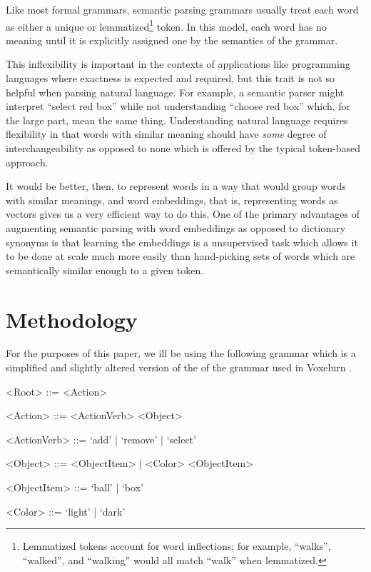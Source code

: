 \documentclass[a4paper]{article}
\begin{document}
Like most formal grammars, semantic parsing grammars usually treat each word
as either a unique or lemmatized\footnote{Lemmatized tokens account for word
inflections; for example, ``walks'', ``walked'', and ``walking'' would all
match ``walk'' when lemmatized.} token.
In this model, each word has no meaning until it is explicitly assigned one
by the semantics of the grammar.

This inflexibility is important in the contexts of applications like programming
languages where exactness is expected and required, but this trait is not so
helpful when parsing natural language.
For example, a semantic parser might interpret ``select red box'' while not
understanding ``choose red box'' which, for the large part, mean the same thing.
Understanding natural language requires flexibility in that words with
similar meaning should have \textit{some} degree of interchangeability as
opposed to none which is offered by the typical token-based approach.

It would be better, then, to represent words in a way that would group words
with similar meanings, and word embeddings, that is, representing words as
vectors gives us a very efficient way to do this.
One of the primary advantages of augmenting semantic parsing with word
embeddings as opposed to dictionary synonyms is that learning the embeddings
is a unsupervised task which allows it to be done at scale much more easily than
hand-picking sets of words which are semantically similar enough to a given
token.

\section{Methodology}

For the purposes of this paper, we ill be using the following grammar
which is a simplified and slightly altered version of the
of the grammar used in Voxelurn \cite{DBLP:journals/corr/WangGLM17}.

\vspace{5mm}
\begin{addmargin}[1cm]{0cm}
    \begin{grammar}

    <Root> ::= <Action>

    <Action> ::= <ActionVerb> <Object>
    
    <ActionVerb> ::= `add' | `remove' | `select'

    <Object> ::= <ObjectItem> | <Color> <ObjectItem>

    <ObjectItem> ::= `ball' | `box'
    
    <Color> ::= `light' | `dark'
    
    \end{grammar}
\end{addmargin}
\vspace{5mm}
\end{document}
